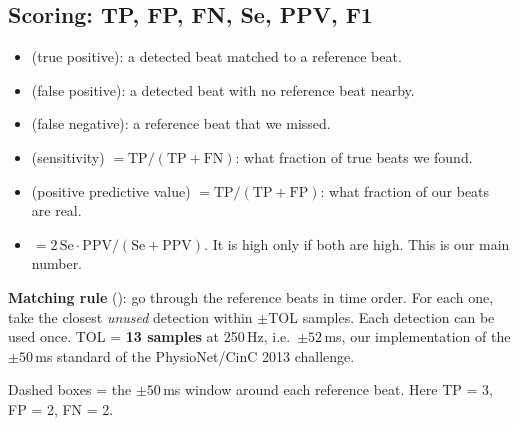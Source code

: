 \documentclass[11pt]{article}
\renewcommand{\file}[1]{\path{#1}}
\begin{document}
\subsection{Scoring: TP, FP, FN, Se, PPV, F1}
\label{sec:scoring}

\begin{itemize}
  \item {} (true positive): a detected beat matched to a reference beat.
  \item {} (false positive): a detected beat with no reference beat nearby.
  \item {} (false negative): a reference beat that we missed.
  \item {} (sensitivity) $= \text{TP}/(\text{TP}+\text{FN})$: what fraction of true beats we found.
  \item {} (positive predictive value) $= \text{TP}/(\text{TP}+\text{FP})$: what fraction of our beats are real.
  \item {} $= 2\,\text{Se}\cdot\text{PPV}/(\text{Se}+\text{PPV})$. It is high only if both are high. This is our main number.
\end{itemize}

\textbf{Matching rule} (\file{harness.match}): go through the reference beats in time order. For each one, take the closest \emph{unused} detection within $\pm$TOL samples. Each detection can be used once. TOL = \textbf{13 samples} at 250\,Hz, i.e.\ $\pm 52$\,ms, our implementation of the $\pm 50$\,ms standard of the PhysioNet/CinC 2013 challenge.

\begin{center}

{\footnotesize Dashed boxes = the $\pm 50$\,ms window around each reference beat. Here TP = 3, FP = 2, FN = 2.}
\end{center}
\end{document}
